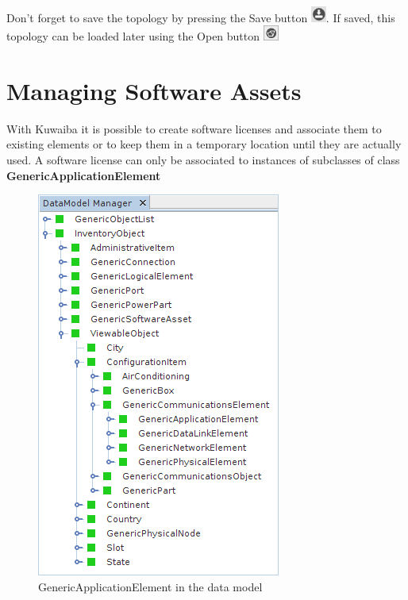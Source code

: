 \documentclass[a4paper]{article}
\begin{document}
		Don't forget to save the topology by pressing the Save button \includegraphics[width=0.5cm]{img/icon_save.png}. If saved, this topology can be loaded later using the Open button  \includegraphics[width=0.5cm]{img/icon_open.png}
	
	\clearpage
    \section{Managing Software Assets} \label{sec:software_assets}
	    
	    With  Kuwaiba it is possible to create  software  licenses  and  associate  them  to  existing elements  or  to  keep  them  in  a  temporary  location  until  they  are  actually  used.  A  software license can only be associated to instances of subclasses of class \textbf{GenericApplicationElement}
	    \begin{figure}[h!]
	    	\centering
	    	\includegraphics[width=0.5\linewidth]{img/software_asset_generic_application_element.png}
	    	\caption{GenericApplicationElement in the  data model}
	    	\label{fig:software_asset_generic_application_element}
	    \end{figure}
	    
\end{document}
